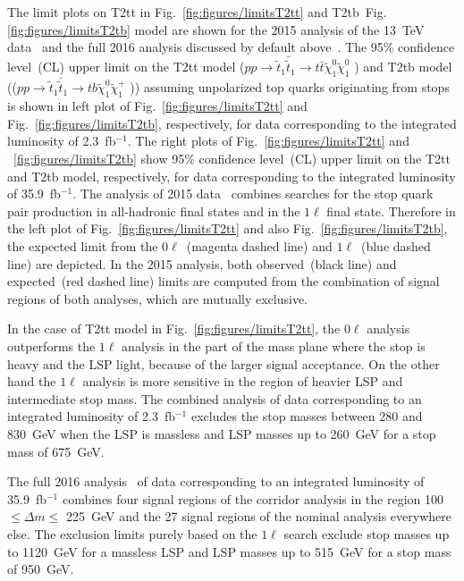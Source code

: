 The limit plots on T2tt in Fig.~\ref{fig:figures/limitsT2tt} and T2tb~Fig.\ref{fig:figures/limitsT2tb} model are shown for the 2015 analysis of the 13~TeV data~\cite{Sirunyan:2016jpr} and the full 2016 analysis discussed by default above~\cite{Sirunyan:2017xse}. The 95\% confidence level~(CL) upper limit on the T2tt model ($ pp \to \tilde{t}_{1} \bar{\tilde{t}}_{1} \to t \bar{t} \tilde{\chi}^{0}_{1} \tilde{\chi}^{0}_{1}$ ) and T2tb model (($ pp \to \tilde{t}_{1} \bar{\tilde{t}}_{1} \to t b \tilde{\chi}^{0}_{1} \tilde{\chi}^{+}_{1}$ )) assuming unpolarized top quarks originating from stops is shown in left plot of Fig.~\ref{fig:figures/limitsT2tt} and Fig.~\ref{fig:figures/limitsT2tb}, respectively, for data corresponding to the integrated luminosity of 2.3~fb$^{-1}$. The right plots of Fig.~\ref{fig:figures/limitsT2tt} and ~\ref{fig:figures/limitsT2tb} show 95\% confidence level~(CL) upper limit on the T2tt and T2tb model, respectively, for data corresponding to the integrated luminosity of 35.9~fb$^{-1}$.  The analysis of 2015 data~\cite{Sirunyan:2016jpr} combines searches for the stop quark pair production in all-hadronic final states and in the $1\ell$ final state. Therefore in the left plot of Fig.~\ref{fig:figures/limitsT2tt} and also Fig.~\ref{fig:figures/limitsT2tb}, the expected limit from the $0\ell$~(magenta dashed line) and $1\ell$~(blue dashed line) are depicted. In the 2015 analysis, both observed~(black line) and expected~(red dashed line) limits are computed from the combination of signal regions of both analyses, which are mutually exclusive. 

In the case of T2tt model in Fig.~\ref{fig:figures/limitsT2tt}, the  $0\ell$ analysis outperforms the $1\ell$ analysis in the part of the mass plane where the stop is heavy and the LSP light, because of the larger signal acceptance. On the other hand the $1\ell$ analysis is more sensitive in the region of heavier LSP and intermediate stop mass. The combined analysis of data corresponding to an integrated luminosity of 2.3~fb$^{-1}$ excludes the stop masses between 280 and 830~GeV when the LSP is massless and LSP masses up to 260~GeV for a stop mass of 675~GeV. 

The full 2016 analysis~\cite{Sirunyan:2017xse} of data corresponding to an integrated luminosity of 35.9~fb$^{-1}$ combines four signal regions of the corridor analysis in the region 100 $\leq \Delta m \leq $ 225~GeV and the 27 signal regions of the nominal analysis everywhere else. The exclusion limits purely based on the $1\ell$ search exclude  stop masses up to 1120~GeV for a massless LSP and LSP masses up to 515~GeV for a stop mass of 950~GeV. 

